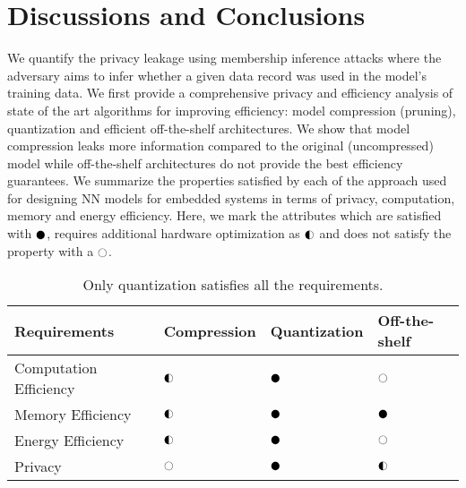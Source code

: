 \section{Discussions and Conclusions}

We quantify the privacy leakage using membership inference attacks where the adversary aims to infer whether a given data record was used in the model's training data.
We first provide a comprehensive privacy and efficiency analysis of state of the art algorithms for improving efficiency: model compression (pruning), quantization and efficient off-the-shelf architectures.
We show that model compression leaks more information compared to the original (uncompressed) model while off-the-shelf architectures do not provide the best efficiency guarantees.
We summarize the properties satisfied by each of the approach used for designing NN models for embedded systems in terms of privacy, computation, memory and energy efficiency.
Here, we mark the attributes which are satisfied with $\cmark$, requires additional hardware optimization as $\smark$ and does not satisfy the property with a $\xmark$.

\begin{table}[!htb]
\begin{center}
\renewcommand\arraystretch{1.5}
\fontsize{6.5pt}{6.5pt}\selectfont
\begin{tabular}{|l||l|l|l|}
\hline
Requirements & Compression & Quantization & Off-the-shelf  \\
\hline
Computation Efficiency & $\smark$  & $\cmark$   & $\xmark$ \\
\hline
Memory Efficiency &  $\smark$ & $\cmark$   & $\cmark$ \\
\hline
Energy Efficiency &  $\smark$   & $\cmark$   & $\xmark$ \\
\hline
Privacy &  $\xmark$   & $\cmark$   & $\smark$ \\
\hline
\end{tabular}
\end{center}
\caption{Only quantization satisfies all the requirements.}
\label{tbl:comparison}
\vspace{-4mm}
\end{table}

